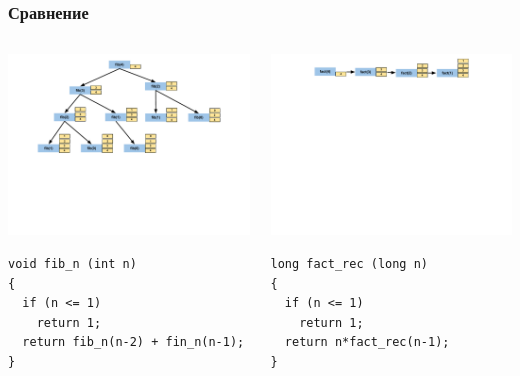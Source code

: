 \documentclass{beamer}
\begin{document}
\begin{frame}[fragile]
\frametitle{Сравнение}

\begin{columns}[t]
  \begin{column}{0.5\textwidth}


\includegraphics[width=7cm]{images/fib_stack}

\vspace{-50px}

\begin{flushleft}
\begin{lstlisting}
void fib_n (int n)
{
  if (n <= 1)
    return 1;
  return fib_n(n-2) + fin_n(n-1);
}
\end{lstlisting}
\end{flushleft}


  \end{column}
  \begin{column}{0.5\textwidth}
\vspace{-1px}
\includegraphics[width=7cm]{images/fact_stack}

\vspace{-40px}

\begin{lstlisting}
long fact_rec (long n)
{
  if (n <= 1)
    return 1;
  return n*fact_rec(n-1);
}
\end{lstlisting}
  \end{column}
\end{columns}


\end{frame}
\end{document}
